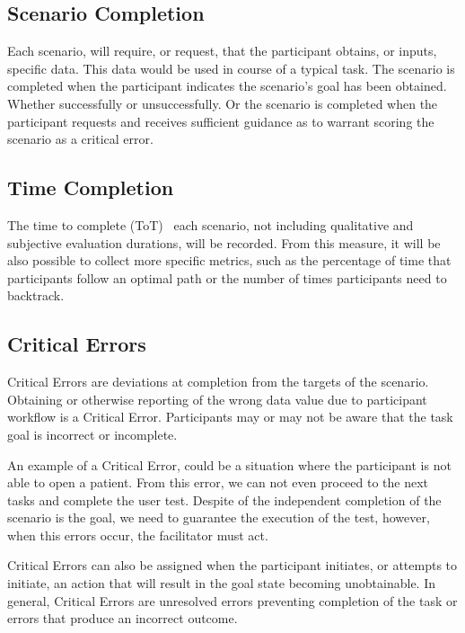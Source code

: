 \subsection{Scenario Completion}

Each scenario, will require, or request, that the participant obtains, or inputs, specific data. This data would be used in course of a typical task. The scenario is completed when the participant indicates the scenario's goal has been obtained. Whether successfully or unsuccessfully. Or the scenario is completed when the participant requests and receives sufficient guidance as to warrant scoring the scenario as a critical error.

\subsection{Time Completion}

The time to complete (ToT)~\cite{delgado2017time, huang2018impact} each scenario, not including qualitative and subjective evaluation durations, will be recorded. From this measure, it will be also possible to collect more specific metrics, such as the percentage of time that participants follow an optimal path or the number of times participants need to backtrack.

\subsection{Critical Errors}

Critical Errors are deviations at completion from the targets of the scenario. Obtaining or otherwise reporting of the wrong data value due to participant workflow is a Critical Error. Participants may or may not be aware that the task goal is incorrect or incomplete.

An example of a Critical Error, could be a situation where the participant is not able to open a patient. From this error, we can not even proceed to the next tasks and complete the user test. Despite of the independent completion of the scenario is the goal, we need to guarantee the execution of the test, however, when this errors occur, the facilitator must act.

Critical Errors can also be assigned when the participant initiates, or attempts to initiate, an action that will result in the goal state becoming unobtainable. In general, Critical Errors are unresolved errors preventing completion of the task or errors that produce an incorrect outcome.

